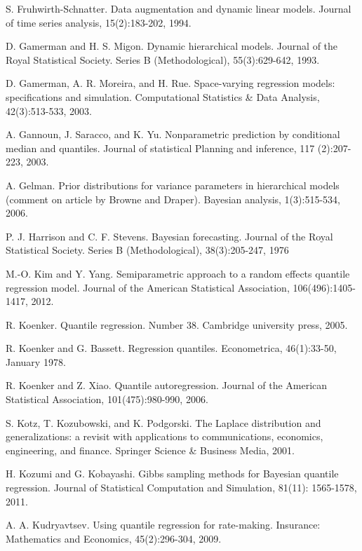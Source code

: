 \documentclass[12pt,a4paper]{article}\usepackage[]{graphicx}\usepackage[]{color}\usepackage{subfigure}
\begin{document}
\begin{thebibliography}{HHH11}
S. Fruhwirth-Schnatter. Data augmentation and dynamic linear models. Journal of time series analysis, 15(2):183-202, 1994.

D. Gamerman and H. S. Migon. Dynamic hierarchical models. Journal of the
Royal Statistical Society. Series B (Methodological), 55(3):629-642, 1993.

D. Gamerman, A. R. Moreira, and H. Rue. Space-varying regression models: specifications and simulation. Computational 
Statistics \& Data Analysis, 42(3):513-533, 2003.

A. Gannoun, J. Saracco, and K. Yu. Nonparametric prediction by conditional
median and quantiles. Journal of statistical Planning and inference, 117
(2):207-223, 2003.

A. Gelman. Prior distributions for variance parameters in hierarchical models
(comment on article by Browne and Draper). Bayesian analysis, 1(3):515-534, 2006.

P. J. Harrison and C. F. Stevens. Bayesian forecasting. Journal of the Royal
Statistical Society. Series B (Methodological), 38(3):205-247, 1976

M.-O. Kim and Y. Yang. Semiparametric approach to a random effects
quantile regression model. Journal of the American Statistical Association,
106(496):1405-1417, 2012.

R. Koenker. Quantile regression. Number 38. Cambridge university press, 2005.

R. Koenker and G. Bassett. Regression quantiles. Econometrica, 46(1):33-50,
January 1978.

R. Koenker and Z. Xiao. Quantile autoregression. Journal of the American
Statistical Association, 101(475):980-990, 2006.

S. Kotz, T. Kozubowski, and K. Podgorski. The Laplace distribution and
generalizations: a revisit with applications to communications, economics,
engineering, and finance. Springer Science \& Business Media, 2001.

H. Kozumi and G. Kobayashi. Gibbs sampling methods for Bayesian quantile
regression. Journal of Statistical Computation and Simulation, 81(11):
1565-1578, 2011.

A. A. Kudryavtsev. Using quantile regression for rate-making. Insurance:
Mathematics and Economics, 45(2):296-304, 2009.


\end{thebibliography}
\end{document}
